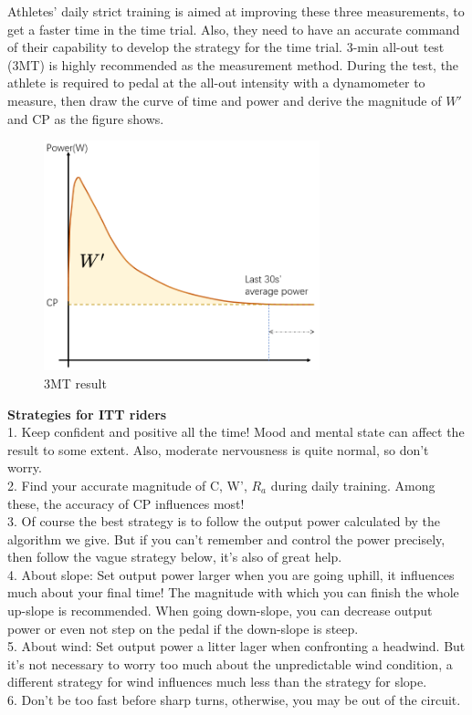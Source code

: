 \documentclass{mcmthesis}
\begin{document}
\begin{spacing}{1.2}
Athletes' daily strict training is aimed at improving these three measurements, to get a faster time in the time trial. Also, they need to have an accurate command of their capability to develop the strategy for the time trial.
3-min all-out test (3MT)  is highly recommended as the measurement method. During the test, the athlete is required to pedal at the all-out intensity with a dynamometer to measure, then draw the curve of time and power and derive the magnitude of ${W}'$ and CP as the figure shows.
\begin{figure}[H]
\small
\centering
\includegraphics[width=8cm]{mcmthesis/figures/define of cp.png}
\caption{3MT result} 
\end{figure}
\noindent \textbf{Strategies for ITT riders}\\
1. Keep confident and positive all the time! Mood and mental state can affect the result to some extent. Also, moderate nervousness is quite normal, so don't worry. \\
2. Find your accurate magnitude of C, W', $R_a$ during daily training. Among these, the accuracy of CP influences most!  \\
3. Of course the best strategy is to follow the output power calculated by the algorithm we give. But if you can't remember and control the power precisely, then follow the vague strategy below, it's also of great help.\\
4. About slope: Set output power larger when you are going uphill, it influences much about your final time! The magnitude with which you can finish the whole up-slope is recommended. When going down-slope, you can decrease output power or even not step on the pedal if the down-slope is steep.\\
5. About wind: Set output power a litter lager when confronting a headwind. But it's not necessary to worry too much about the unpredictable wind condition, a different strategy for wind influences much less than the strategy for slope.\\
6. Don't be too fast before sharp turns, otherwise, you may be out of the circuit.


\end{spacing}
\end{document}
